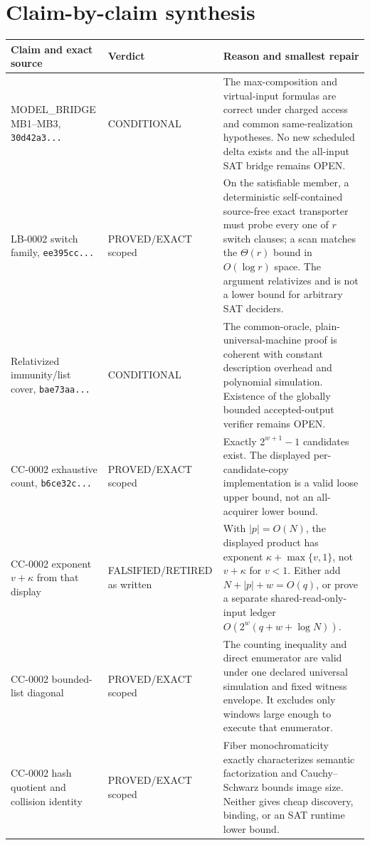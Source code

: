 \documentclass[11pt]{article}
\begin{document}
\section{Claim-by-claim synthesis}
\begin{longtable}{p{}p{}p{}}
\toprule
Claim and exact source & Verdict & Reason and smallest repair\\\midrule\endhead
MODEL\_BRIDGE MB1--MB3, \texttt{30d42a3...}
& CONDITIONAL & The max-composition and virtual-input formulas are correct
under charged access and common same-realization hypotheses.  No new scheduled
delta exists and the all-input SAT bridge remains OPEN.\\
LB-0002 switch family, \texttt{ee395cc...}
& PROVED/EXACT scoped & On the satisfiable member, a deterministic
self-contained source-free exact transporter must probe every one of $r$
switch clauses; a scan matches the $\Theta(r)$ bound in $O(\log r)$ space.
The argument relativizes and is not a lower bound for arbitrary SAT deciders.\\
Relativized immunity/list cover, \texttt{bae73aa...}
& CONDITIONAL & The common-oracle, plain-universal-machine proof is coherent
with constant description overhead and polynomial simulation.  Existence of
the globally bounded accepted-output verifier remains OPEN.\\
CC-0002 exhaustive count, \texttt{b6ce32c...}
& PROVED/EXACT scoped & Exactly $2^{w+1}-1$ candidates exist.  The displayed
per-candidate-copy implementation is a valid loose upper bound, not an
all-acquirer lower bound.\\
CC-0002 exponent $v+\kappa$ from that display
& FALSIFIED/RETIRED as written & With $|p|=O(N)$, the displayed product has
exponent $\kappa+\max\{v,1\}$, not $v+\kappa$ for $v<1$.  Either add
$N+|p|+w=O(q)$, or prove a separate shared-read-only-input ledger
$O(2^w(q+w+\log N))$.\\
CC-0002 bounded-list diagonal
& PROVED/EXACT scoped & The counting inequality and direct enumerator are
valid under one declared universal simulation and fixed witness envelope.
It excludes only windows large enough to execute that enumerator.\\
CC-0002 hash quotient and collision identity
& PROVED/EXACT scoped & Fiber monochromaticity exactly characterizes semantic
factorization and Cauchy--Schwarz bounds image size.  Neither gives cheap
discovery, binding, or an SAT runtime lower bound.\\
\bottomrule
\end{longtable}
\end{document}

